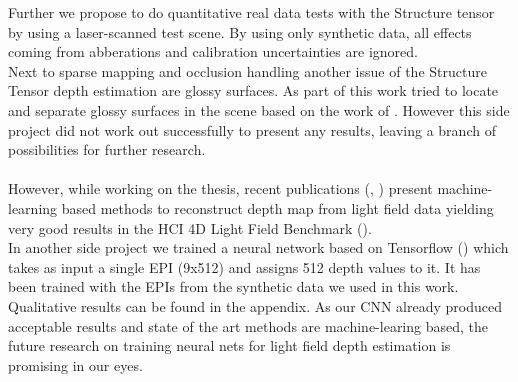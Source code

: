 \documentclass  [
  paper    = a4,
  BCOR     = 10mm,
  twoside,
  fontsize = 12pt,
  fleqn,
  toc      = bibnumbered,
  toc      = listofnumbered,
  numbers  = noendperiod,
  headings = normal,
  listof   = leveldown,
  version  = 3.03
]                                       {scrreprt}
\begin{document}
Further we propose to do quantitative real data tests with the Structure tensor by using a laser-scanned test scene. By using only synthetic data, all effects coming from abberations and calibration uncertainties are ignored.\\
Next to sparse mapping and occlusion handling another issue of the Structure Tensor depth estimation are glossy surfaces. As part of this work tried to locate and separate glossy surfaces in the scene based on the work of \cite{tao2017shape}. However this side project did not work out successfully to present any results, leaving a branch of possibilities for further research.\\
\\ 
However, while working on the thesis, recent publications (\cite{luo2017epi}, \cite{shin18epinet}) present machine-learning based methods to reconstruct depth map from light field data yielding very good results in the HCI 4D Light Field Benchmark (\cite{hci_benchmark}).\\
In another side project we trained a neural network based on Tensorflow (\cite{tensorflow2015-whitepaper}) which takes as input a single EPI (9x512) and assigns 512 depth values to it. It has been trained with the EPIs from the synthetic data we used in this work. Qualitative results can be found in the appendix. As our CNN already produced acceptable results and state of the art methods are machine-learing based, the future research on training neural nets for light field depth estimation is promising in our eyes.
\end{document}
